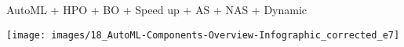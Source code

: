 	\begin{frame}[c]{AutoML + HPO + BO + Speed up + AS + NAS + Dynamic}
		
		\centering
		\texttt{[image: images/18\_AutoML-Components-Overview-Infographic\_corrected\_e7]}
		
	\end{frame}


